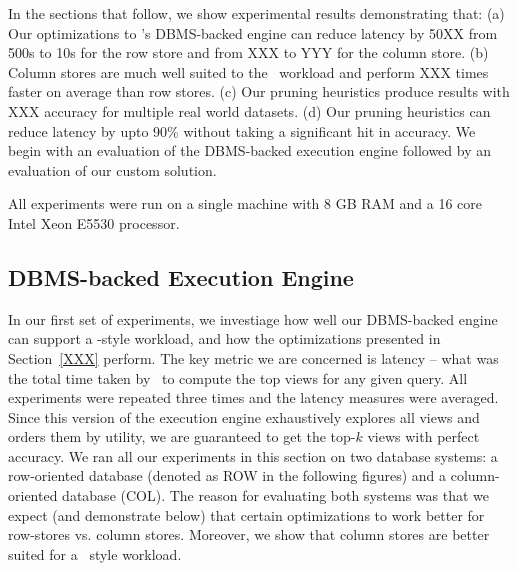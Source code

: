 In the sections that follow, we show experimental results demonstrating that:
(a) Our optimizations to \VizRecDB's DBMS-backed engine can reduce latency by
50XX from 500s to 10s for the row store and from XXX to YYY for the column
store.
(b) Column stores are much well suited to the \VizRecDB\ workload and perform XXX times
faster on average than row stores. 
(c) Our pruning heuristics produce results with XXX accuracy for multiple real
world datasets.
(d) Our pruning heuristics can reduce latency by upto 90\% without taking a
significant hit in accuracy.
We begin with an evaluation of the DBMS-backed execution engine followed by an
evaluation of our custom solution.

 All experiments were run on a single machine with 8 GB RAM and a 16 core Intel
 Xeon E5530 processor. 

\subsection{DBMS-backed Execution Engine}
\label{sec:expts_dbms_execution_engine}

In our first set of experiments, we investiage how well our DBMS-backed engine
can support a \VizRecDB-style workload, and how the optimizations
presented in Section~\ref{XXX} perform.
The key metric we are concerned is latency -- what was the total time taken by
\VizRecDB\ to compute the top views for any given query.
All experiments were repeated three times and the latency measures were
averaged.
Since this version of the execution engine exhaustively explores all views and
 orders them by utility, we are guaranteed to get the top-$k$ views with
perfect accuracy.
We ran all our experiments in this section on two database systems: a
row-oriented database (denoted as ROW in the following figures) and a
column-oriented database (COL).
The reason for evaluating both systems was that we expect (and
demonstrate below) that certain optimizations to work better for row-stores vs.
column stores.
Moreover, we show that column stores are better suited for a \VizRecDB\ style
workload.


